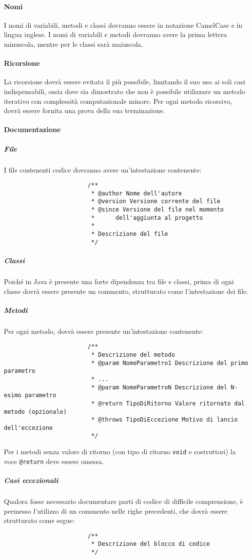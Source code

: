 \documentclass[../NormeProgetto.tex]{subfiles}
\begin{document}
			\paragraph{Nomi}
				I nomi di variabili, metodi e classi dovranno essere in notazione CamelCase e in lingua inglese. I nomi di variabili e metodi dovranno avere la prima lettera minuscola, mentre per le classi sarà maiuscola.
			\paragraph{Ricorsione}
				La ricorsione dovrà essere evitata il più possibile, limitando il suo uso ai soli casi indispensabili, ossia dove sia dimostrato che non è possibile utilizzare un metodo iterativo con complessità computazionale minore. Per ogni metodo ricorsivo, dovrà essere fornita una prova della sua terminazione.
			\paragraph{Documentazione}
				\subparagraph{File}
					I file contenenti codice dovranno avere un'intestazione contenente:
					\begin{lstlisting}
						/**
						 * @author Nome dell'autore
						 * @version Versione corrente del file 
						 * @since Versione del file nel momento
						 *		dell'aggiunta al progetto
						 *
						 * Descrizione del file
						 */
					\end{lstlisting}
				\subparagraph{Classi}
					Poiché in Java è presente una forte dipendenza tra file e classi, prima di ogni classe dovrà essere presente un commento, strutturato come l'intestazione dei file.
				\subparagraph{Metodi}
					Per ogni metodo, dovrà essere presente un'intestazione contenente:
					\begin{lstlisting}
						/**
						 * Descrizione del metodo
						 * @param NomeParametro1 Descrizione del primo parametro
						 * ...
						 * @param NomeParametroN Descrizione del N-esimo parametro
						 * @return TipoDiRitorno Valore ritornato dal metodo (opzionale)
						 * @throws TipoDiEccezione Motivo di lancio dell'eccezione
						 */
					\end{lstlisting}
					
					Per i metodi senza valore di ritorno (con tipo di ritorno \texttt{void} e costruttori) la voce \texttt{@return} deve essere omessa.
				\subparagraph{Casi eccezionali}
					Qualora fosse necessario documentare parti di codice di difficile comprensione, è permesso l'utilizzo di un commento nelle righe precedenti, che dovrà essere strutturato come segue:
					\begin{lstlisting}
						/**
						 * Descrizione del blocco di codice
						 */
					\end{lstlisting}
\end{document}
